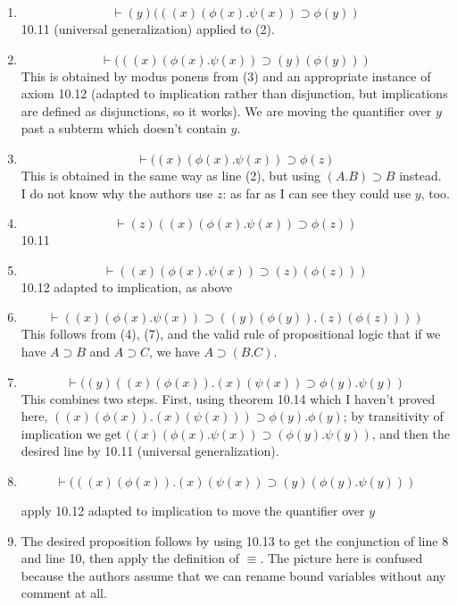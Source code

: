 \documentclass[12pt]{article}
\begin{document}
\begin{description}
\begin{enumerate}
\item  $$\vdash (y)(((x)(\phi(x).\psi(x)) \supset \phi(y))$$  10.11 (universal generalization) applied to (2).

\item $$\vdash (((x)(\phi(x).\psi(x)) \supset (y)(\phi(y)))$$  This is obtained by modus ponens from (3) and an appropriate instance of axiom 10.12 (adapted to implication rather than disjunction, but implications are defined as disjunctions, so it works).  We are moving the quantifier over $y$ past a subterm which doesn't contain $y$.

\item $$\vdash ((x)(\phi(x).\psi(x)) \supset \phi(z)$$  This is obtained in the same way as line (2), but using $(A.B) \supset B$ instead.  I do not know why the authors use $z$:  as far as I can see they could use $y$, too.

\item $$\vdash (z)((x)(\phi(x).\psi(x)) \supset \phi(z))$$  10.11

\item $$\vdash ((x)(\phi(x).\psi(x)) \supset (z)(\phi(z)))$$  10.12 adapted to implication, as above

\item $$\vdash ((x)(\phi(x).\psi(x)) \supset ((y)(\phi(y)).(z)(\phi(z))))$$  This follows from (4), (7), and the valid rule of propositional logic that if we have $A \supset B$ and
$A \supset C$, we have $A \supset (B.C)$.

\item $$\vdash ((y)((x)(\phi(x)).(x)(\psi(x)) \supset \phi(y).\psi(y))$$  This combines two steps.  First, using theorem 10.14 which I haven't proved here, $((x)(\phi(x)).(x)(\psi(x))) \supset \phi(y).\phi(y)$;  by transitivity of implication we get $((x)(\phi(x).\psi(x)) \supset (\phi(y).\psi(y))$, and then the desired line by 10.11 (universal generalization).

\item $$\vdash (((x)(\phi(x)).(x)(\psi(x)) \supset (y)(\phi(y).\psi(y)))$$

apply 10.12 adapted to implication to move the quantifier over $y$

\item The desired proposition follows by using 10.13 to get the conjunction of line 8 and line 10, then apply the definition of $\equiv$.  The picture here is confused because the authors assume that we can rename bound variables without any comment at all.



\end{enumerate}

\end{description}
\end{document}
